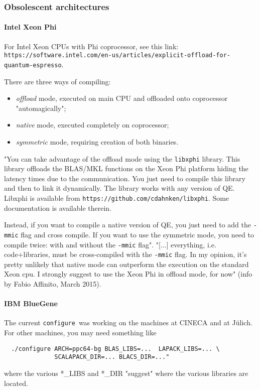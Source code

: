 \documentclass[12pt,a4paper]{article}
\def\configure{\texttt{configure}}
\begin{document}
\subsubsection{Obsolescent architectures}

\paragraph{Intel Xeon Phi}

For Intel Xeon CPUs with Phi coprocessor, see this link:\\
\texttt{https://software.intel.com/en-us/articles/explicit-offload-for-quantum-espresso}.

There are three ways of compiling:
\begin{itemize}
\item {\em offload} mode, executed on main CPU and offloaded onto coprocessor
"automagically";
\item {\em native} mode, executed completely on coprocessor;
\item {\em symmetric} mode, requiring creation of both binaries.
\end{itemize}
"You can take advantage of the offload mode using the \texttt{libxphi}
library. This library offloads the BLAS/MKL functions on the Xeon Phi
platform hiding the latency times due to the communication. You just
need to compile this library and then to link it dynamically. The
library works with any version of QE. Libxphi is available from
\texttt{https://github.com/cdahnken/libxphi}. Some documentation is
available therein.

Instead, if you want to compile a native version of QE, you just need
to add the \texttt{-mmic} flag and cross compile. If you want to use
the symmetric mode, you need to compile twice: with and without the
\texttt{-mmic} flag". "[...] everything, i.e. code+libraries, must be
cross-compiled with the \texttt{-mmic} flag. In my opinion, it's pretty
unlikely that native mode can outperform the execution on the standard
Xeon cpu. I strongly suggest to use the Xeon Phi in offload mode, for now"
(info by Fabio Affinito, March 2015).

\paragraph{IBM BlueGene}

The current \configure\ was working on the machines at CINECA and at J\"ulich.
For other machines, you may need something like
\begin{verbatim}
  ./configure ARCH=ppc64-bg BLAS_LIBS=...  LAPACK_LIBS=... \
              SCALAPACK_DIR=... BLACS_DIR=..."
\end{verbatim}
where the various *\_LIBS and *\_DIR "suggest" where the various libraries
are located.
\end{document}
